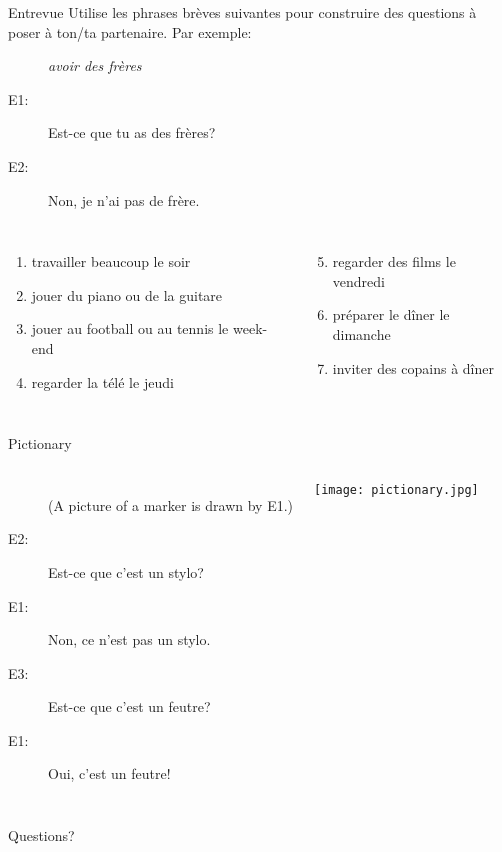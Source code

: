 \documentclass{beamer}
\begin{document}
  \begin{frame}{Entrevue}
    Utilise les phrases brèves suivantes pour construire des questions à poser à ton/ta partenaire.
    Par exemple: \\
    \begin{description}
      \item[] \emph{avoir des frères}
      \item[E1:] Est-ce que tu as des frères?
      \item[E2:] Non, je n'ai pas de frère.
    \end{description}
    \begin{columns}[t]
        \begin{enumerate}
          \item travailler beaucoup le soir
          \item jouer du piano ou de la guitare
          \item jouer au football ou au tennis le week-end
          \item regarder la télé le jeudi
        \end{enumerate}
        \begin{enumerate}
          \setcounter{enumi}{4}
          \item regarder des films le vendredi
          \item préparer le dîner le dimanche
          \item inviter des copains à dîner
        \end{enumerate}
    \end{columns}
  \end{frame}

  \begin{frame}{Pictionary}
    \begin{columns}
        \begin{description}
          \item[] (A picture of a marker is drawn by E1.)
          \item[E2:] Est-ce que c'est un stylo?
          \item[E1:] Non, ce n'est pas un stylo.
          \item[E3:] Est-ce que c'est un feutre?
          \item[E1:] Oui, c'est un feutre!
        \end{description}
        \begin{center}
          \texttt{[image: pictionary.jpg]}
        \end{center}
    \end{columns}
  \end{frame}

  \begin{frame}{}
    \begin{center}
      \Large Questions?
    \end{center}
  \end{frame}
\end{document}
